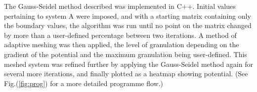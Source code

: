 \documentclass[a4paper]{jpconf}
\begin{document}
The Gauss-Seidel method described was implemented in C++. Initial values pertaining to system A were imposed, and with a starting matrix containing only the boundary values, the algorithm was run until no point on the matrix changed by more than a user-defined percentage between two iterations. A method of adaptive meshing was then applied, the level of granulation depending on the gradient of the potential and the maximum granulation being user-defined. This meshed system was refined further by applying the Gauss-Seidel method again for several more iterations, and finally plotted as a heatmap showing potential. (See Fig.(\ref{fig:prog}) for a more detailed programme flow.)

%
%				
%			
%				
\end{document}

